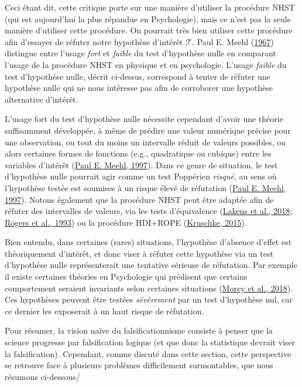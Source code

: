 \documentclass[
  a4paper,11pt,twoside,onecolumn,openright,final,oldfontcommands]{memoir}
\theoremstyle{definition}
\theoremstyle{definition}
\theoremstyle{definition}
\theoremstyle{definition}
\theoremstyle{remark}
\begin{document}
Ceci étant dit, cette critique porte sur une manière d'utiliser la procédure NHST (qui est aujourd'hui la plus répandue en Psychologie), mais ce n'est pas la seule manière d'utiliser cette procédure. On pourrait très bien utiliser cette procédure afin d'essayer de réfuter notre hypothèse d'intérêt \(\mathcal{T}\). Paul E. Meehl (\protect\hyperlink{ref-meehl_theory-testing_1967}{1967}) distingue entre l'usage \emph{fort} et \emph{faible} du test d'hypothèse nulle en comparant l'usage de la procédure NHST en physique et en psychologie. L'usage \emph{faible} du test d'hypothèse nulle, décrit ci-dessus, correspond à tenter de réfuter une hypothèse nulle qui ne nous intéresse pas afin de corroborer une hypothèse alternative d'intérêt.

L'usage fort du test d'hypothèse nulle nécessite cependant d'avoir une théorie suffisamment développée, à même de prédire une valeur numérique précise pour une observation, ou tout du moins un intervalle réduit de valeurs possibles, ou alors certaines formes de fonctions (e.g., quadratique ou cubique) entre les variables d'intérêt (\protect\hyperlink{ref-harlow_problem_1997}{Paul E. Meehl, 1997}). Dans ce genre de situation, le test d'hypothèse nulle pourrait agir comme un test Poppérien \emph{risqué}, au sens où l'hypothèse testée est soumises à un risque élevé de réfutation (\protect\hyperlink{ref-harlow_problem_1997}{Paul E. Meehl, 1997}). Notons également que la procédure NHST peut être adaptée afin de réfuter des intervalles de valeurs, via les tests d'équivalence (\protect\hyperlink{ref-lakens_equivalence_2018}{Lakens et al., 2018}; \protect\hyperlink{ref-rogers_using_1993}{Rogers et al., 1993}) ou la procédure HDI+ROPE (\protect\hyperlink{ref-kruschke_doing_2015}{Kruschke, 2015}).

Bien entendu, dans certaines (rares) situations, l'hypothèse d'absence d'effet est théoriquement d'intérêt, et donc viser à réfuter cette hypothèse via un test d'hypothèse nulle représenterait une tentative sérieuse de réfutation. Par exemple il existe certaines théories en Psychologie qui prédisent que certains comportement seraient invariants selon certaines situations (\protect\hyperlink{ref-morey_beyond_2018}{Morey et al., 2018}). Ces hypothèses peuvent être testées \emph{sévèrement} par un test d'hypothèse nul, car ce dernier les exposerait à un haut risque de réfutation.

Pour résumer, la vision naïve du falsificationnisme consiste à penser que la science progresse par falsification logique (et que donc la statistique devrait viser la falsification). Cependant, comme discuté dans cette section, cette perspective se retrouve face à plusieurs problèmes difficilement surmontables, que nous résumons ci-dessous/
\end{document}

